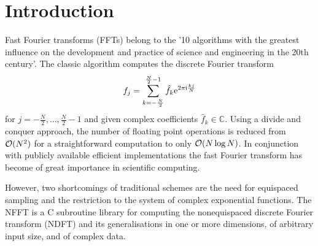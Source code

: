 \hypertarget{index_introduction}{}\section{Introduction}\label{index_introduction}
Fast Fourier transforms (F\-F\-Ts) belong to the '10 algorithms with the greatest influence on the development and practice of science and engineering in the 20th century'. The classic algorithm computes the discrete Fourier transform \[ f_j= \sum_{k=-\frac{N}{2}}^{\frac{N}{2}-1} \hat{f}_{k} {\rm e}^{2\pi{\rm i}\frac{kj}{N}} \] for $j=-\frac{N}{2},\dots,\frac{N}{2}-1$ and given complex coefficients $\hat{f}_{k}\in\mathbb{C}$. Using a divide and conquer approach, the number of floating point operations is reduced from ${\cal O}(N^2)$ for a straightforward computation to only ${\cal O}(N\log N)$. In conjunction with publicly available efficient implementations the fast Fourier transform has become of great importance in scientific computing.

However, two shortcomings of traditional schemes are the need for equispaced sampling and the restriction to the system of complex exponential functions. The N\-F\-F\-T is a C subroutine library for computing the nonequispaced discrete Fourier transform (N\-D\-F\-T) and its generalisations in one or more dimensions, of arbitrary input size, and of complex data.

